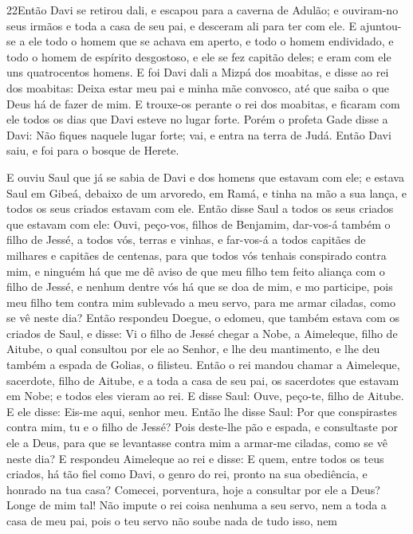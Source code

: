 \medskip

\lettrine{22} Então Davi se retirou dali, e escapou para a
caverna de Adulão; e ouviram-no seus irmãos e toda a casa de seu
pai, e desceram ali para ter com ele. E ajuntou-se a ele todo o
homem que se achava em aperto, e todo o homem endividado, e todo o
homem de espírito desgostoso, e ele se fez capitão deles; e eram com
ele uns quatrocentos homens. E foi Davi dali a Mizpá dos
moabitas, e disse ao rei dos moabitas: Deixa estar meu pai e minha
mãe convosco, até que saiba o que Deus há de fazer de mim. E
trouxe-os perante o rei dos moabitas, e ficaram com ele todos os
dias que Davi esteve no lugar forte. Porém o profeta Gade disse
a Davi: Não fiques naquele lugar forte; vai, e entra na terra de
Judá. Então Davi saiu, e foi para o bosque de Herete.

E ouviu Saul que já se sabia de Davi e dos homens que estavam com
ele; e estava Saul em Gibeá, debaixo de um arvoredo, em Ramá, e
tinha na mão a sua lança, e todos os seus criados estavam com ele.
Então disse Saul a todos os seus criados que estavam com ele:
Ouvi, peço-vos, filhos de Benjamim, dar-vos-á também o filho de
Jessé, a todos vós, terras e vinhas, e far-vos-á a todos capitães de
milhares e capitães de centenas, para que todos vós tenhais
conspirado contra mim, e ninguém há que me dê aviso de que meu filho
tem feito aliança com o filho de Jessé, e nenhum dentre vós há que
se doa de mim, e mo participe, pois meu filho tem contra mim
sublevado a meu servo, para me armar ciladas, como se vê neste dia?
Então respondeu Doegue, o edomeu, que também estava com os
criados de Saul, e disse: Vi o filho de Jessé chegar a Nobe, a
Aimeleque, filho de Aitube, o qual consultou por ele ao
Senhor, e lhe deu mantimento, e lhe deu também a espada de Golias, o
filisteu. Então o rei mandou chamar a Aimeleque, sacerdote,
filho de Aitube, e a toda a casa de seu pai, os sacerdotes que
estavam em Nobe; e todos eles vieram ao rei. E disse Saul:
Ouve, peço-te, filho de Aitube. E ele disse: Eis-me aqui, senhor
meu. Então lhe disse Saul: Por que conspirastes contra mim,
tu e o filho de Jessé? Pois deste-lhe pão e espada, e consultaste
por ele a Deus, para que se levantasse contra mim a armar-me
ciladas, como se vê neste dia? E respondeu Aimeleque ao rei e
disse: E quem, entre todos os teus criados, há tão fiel como Davi, o
genro do rei, pronto na sua obediência, e honrado na tua casa?
Comecei, porventura, hoje a consultar por ele a Deus? Longe
de mim tal! Não impute o rei coisa nenhuma a seu servo, nem a toda a
casa de meu pai, pois o teu servo não soube nada de tudo isso, nem
